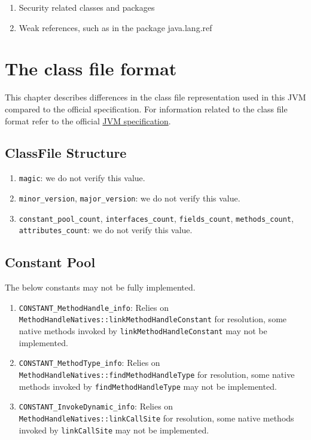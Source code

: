 \begin{enumerate}
\item Security related classes and packages
\item Weak references, such as in the package java.lang.ref
\end{enumerate}

\section{The class file format}

This chapter describes differences in the class file representation used in this JVM compared to the official specification.
For information related to the class file format refer to the official \href{https://docs.oracle.com/javase/specs/jvms/se8/html/jvms-4.html}{JVM specification}.

\subsection{ClassFile Structure}

\begin{enumerate}
\item \texttt{magic}: we do not verify this value.
\item \texttt{minor\_version}, \texttt{major\_version}: we do not verify this value.
\item \texttt{constant\_pool\_count}, \texttt{interfaces\_count}, \texttt{fields\_count}, \texttt{methods\_count}, \texttt{attributes\_count}: we do not verify this value.
\end{enumerate}

\subsection{Constant Pool}

The below constants may not be fully implemented.

\begin{enumerate}
\item \texttt{CONSTANT\_MethodHandle\_info}: Relies on \texttt{MethodHandleNatives::linkMethodHandleConstant} for resolution, some native methods invoked by \texttt{linkMethodHandleConstant} may not be implemented.
\item \texttt{CONSTANT\_MethodType\_info}: Relies on \texttt{MethodHandleNatives::findMethodHandleType} for resolution, some native methods invoked by \texttt{findMethodHandleType} may not be implemented.
\item \texttt{CONSTANT\_InvokeDynamic\_info}: Relies on \texttt{MethodHandleNatives::linkCallSite} for resolution, some native methods invoked by \texttt{linkCallSite} may not be implemented.
\end{enumerate}

